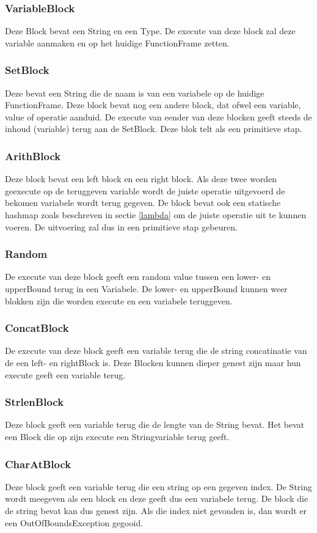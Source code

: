 \documentclass[]{article}
\begin{document}
\subsubsection{VariableBlock}
Deze Block bevat een String en een Type. De execute van deze block zal deze variable aanmaken en op het huidige FunctionFrame zetten.

\subsubsection{SetBlock}
Deze bevat een String die de naam is van een variabele op de huidige FunctionFrame. Deze block bevat nog een andere block, dat ofwel een variable, value of operatie aanduid. De execute van eender van deze blocken geeft steeds de inhoud (variable) terug aan de SetBlock. Deze blok telt als een primitieve stap.
\subsubsection{ArithBlock}
Deze block bevat een left block en een right block. Als deze twee worden geexecute op de teruggeven variable wordt de juiste operatie uitgevoerd de bekomen variabele wordt terug gegeven. De block bevat ook een statische hashmap zoals beschreven in sectie \ref{lambda} om de juiste operatie uit te kunnen voeren.
De uitvoering zal dus in een primitieve stap gebeuren.
\subsubsection{Random}
De execute van deze block geeft een random value tussen een lower- en upperBound terug in een Variabele. De lower- en upperBound kunnen weer blokken zijn die worden execute en een variabele teruggeven.
\subsubsection{ConcatBlock}
De execute van deze block geeft een variable terug die de string concatinatie van de een left- en rightBlock is. Deze Blocken kunnen dieper genest zijn maar hun execute geeft een variable terug.
\subsubsection{StrlenBlock}
Deze block geeft een variable terug die de lengte van de String bevat. Het bevat een Block die op zijn execute een Stringvariable terug geeft.
\subsubsection{CharAtBlock} 
Deze block geeft een variable terug die een string op een gegeven index. De String wordt meegeven als een block en deze geeft dus een variabele terug. De block die de string bevat kan dus genest zijn. Als die index niet gevonden is, dan wordt er een OutOfBoundsException gegooid.
\end{document}
